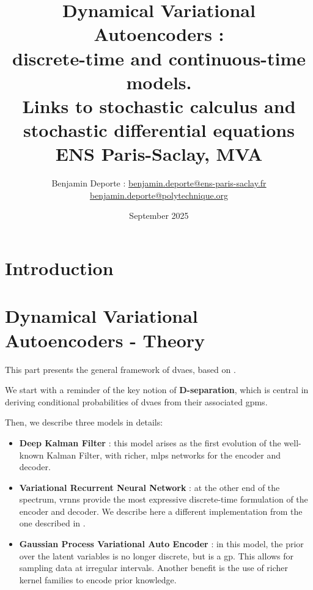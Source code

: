 \documentclass[twoside,11pt]{report}
\title{Dynamical Variational Autoencoders :\\ discrete-time and continuous-time models.\\ Links to stochastic calculus and stochastic differential equations\\
\vspace{2cm}
{\Large{ENS Paris-Saclay, MVA}}}
\author{
Benjamin Deporte : \href{mailto:benjamin.deporte@ens-paris-saclay.fr}{benjamin.deporte@ens-paris-saclay.fr}\\
\href{mailto:benjamin.deporte@polytechnique.org}{benjamin.deporte@polytechnique.org}%
}
\date{September 2025}
\begin{document}
\everymath{\displaystyle}
\maketitle



\newpage
\singlespacing
\tableofcontents

\newpage
\listoffigures

\part{Introduction}
    
    

%
%
%
%
\part{Dynamical Variational Autoencoders - Theory}

This part presents the general framework of \glspl{dvae}, based on \cite{girin_dynamical_2022}. 

We start with a reminder of the key notion of \textbf{D-separation}, which is central in deriving conditional probabilities of \glspl{dvae} from their 
associated \glspl{gpm}.

Then, we describe three models in details:

\begin{itemize}
    \item \textbf{Deep Kalman Filter} : this model arises as the first evolution of the well-known Kalman Filter, with richer, \glspl{mlp} networks for the encoder and decoder.
    \item \textbf{Variational Recurrent Neural Network} : at the other end of the spectrum, \glspl{vrnn} provide the most expressive discrete-time formulation of the encoder and decoder.
We describe here a different implementation from the one described in \cite{girin_dynamical_2022}.
    \item \textbf{Gaussian Process Variational Auto Encoder} : in this model, the prior over the latent variables is no longer discrete, but is a \gls{gp}.
This allows for sampling data at irregular intervals. Another benefit is the use of richer kernel families to encode prior knowledge.
\end{itemize}
\end{document}
